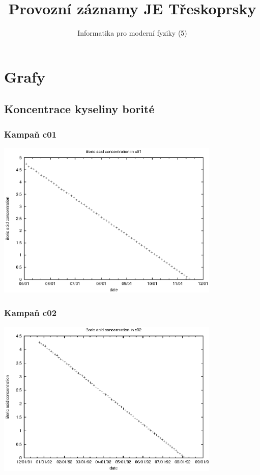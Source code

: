 \documentclass[a4paper,twoside,11pt]{article}
\title{Provozní záznamy JE Třeskoprsky}
\author{Informatika pro moderní fyziky (5)}
\begin{document}
\maketitle

\tableofcontents

\section{Grafy}

\subsection{Koncentrace kyseliny borité}



\subsubsection{Kampaň c01}

\includegraphics[width=0.8\textwidth]{data_c01_bc.eps}


\subsubsection{Kampaň c02}

\includegraphics[width=0.8\textwidth]{data_c02_bc.eps}
\end{document}
